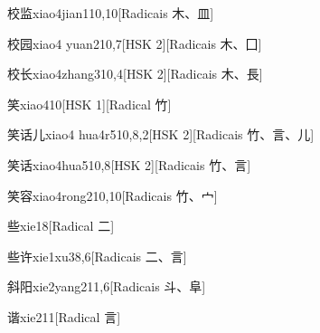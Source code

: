 \begin{entry}{校监}{xiao4jian1}{10,10}[Radicais ⽊、⽫]
\end{entry}

\begin{entry}{校园}{xiao4 yuan2}{10,7}[HSK 2][Radicais ⽊、⼞]
\end{entry}

\begin{entry}{校长}{xiao4zhang3}{10,4}[HSK 2][Radicais ⽊、⾧]
\end{entry}

\begin{entry}{笑}{xiao4}{10}[HSK 1][Radical ⽵]
\end{entry}

\begin{entry}{笑话儿}{xiao4 hua4r5}{10,8,2}[HSK 2][Radicais ⽵、⾔、⼉]
\end{entry}

\begin{entry}{笑话}{xiao4hua5}{10,8}[HSK 2][Radicais ⽵、⾔]
\end{entry}

\begin{entry}{笑容}{xiao4rong2}{10,10}[Radicais ⽵、⼧]
\end{entry}

\begin{entry}{些}{xie1}{8}[Radical ⼆]
\end{entry}

\begin{entry}{些许}{xie1xu3}{8,6}[Radicais ⼆、⾔]
\end{entry}

\begin{entry}{斜阳}{xie2yang2}{11,6}[Radicais ⽃、⾩]
\end{entry}

\begin{entry}{谐}{xie2}{11}[Radical ⾔]
\end{entry}

